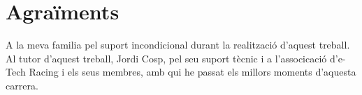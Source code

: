 \chapter*{Agraïments}
\par A la meva familia pel suport incondicional durant la realització d'aquest treball. Al tutor d'aquest treball, Jordi Cosp, pel seu suport tècnic i a l'associcació d'e-Tech Racing i els seus membres, amb qui he passat els millors moments d'aquesta carrera. 

